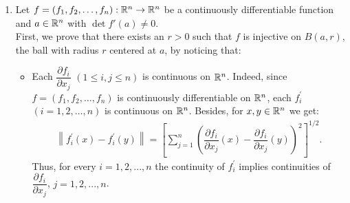 \begin{problem}
\begin{solution}
\begin{enumerate}
    \begin{align*}
        (f^{-1})'(y) = \big[f'(f^{-1}(y))\big]^{-1}, \forall y \in V,
    \end{align*}
    \item[(c)] Let $f = (f_1, f_2, \ldots, f_n): \mathbb{R}^n \to \mathbb{R}^n$ be a continuously differentiable function and $a \in \mathbb{R}^n$ with $\det f'(a) \ne 0$. \\
    
    First, we prove that there exists an $r > 0$ such that $f$ is injective on $B(a,r)$, the ball with radius $r$ centered at $a$, by noticing that:
    \begin{itemize}
        \item Each $\dfrac{\partial f_i}{\partial x_j}$ $(1\le i,j \le n)$ is continuous on $\mathbb{R}^n$. Indeed, since $f=(f_1,f_2,\ldots,f_n)$ is continuously differentiable on $\mathbb{R}^n$, each $f_i^{'}$ $(i=1,2,\ldots,n)$ is continuous on $\mathbb{R}^n$. Besides, for $x,y\in \mathbb{R}^n$ we get:
        \begin{align*}
            \left\| f_i^{'} (x) - f_i^{'}(y) \right\| = \left[ \displaystyle\sum\limits_{j=1}^n\left( \dfrac{\partial f_i}{\partial x_j} (x) - \dfrac{\partial f_i}{\partial x_j} (y) \right)^2 \right]^{1/2}.
        \end{align*}
        Thus, for every $i=1,2,...,n$ the continuity of $f_i^{'}$ implies continuities of $\dfrac{\partial f_i}{\partial x_j}$, $j=1,2,...,n$.
       

\end{itemize}
\end{enumerate}
\end{solution}
\end{problem}
